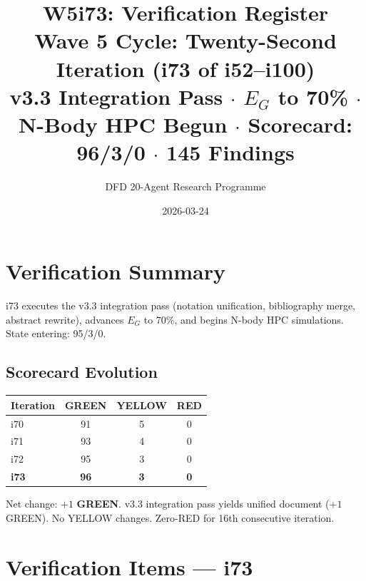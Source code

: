\documentclass[11pt,a4paper]{article}
\title{\Large W5i73: Verification Register\\[6pt]
\normalsize Wave 5 Cycle: Twenty-Second Iteration (i73 of i52--i100)\\[6pt]
v3.3 Integration Pass $\cdot$ $E_G$ to 70\% $\cdot$ N-Body HPC Begun $\cdot$ Scorecard: 96/3/0 $\cdot$ 145 Findings}
\author{DFD 20-Agent Research Programme}
\date{2026-03-24}
\newcommand{\GREEN}{\textcolor{dfdgreen}{\textbf{GREEN}}}
\begin{document}
\maketitle

\section{Verification Summary}

i73 executes the v3.3 integration pass (notation unification, bibliography merge, abstract rewrite), advances $E_G$ to 70\%, and begins N-body HPC simulations. State entering: 95/3/0.

\subsection{Scorecard Evolution}

\begin{center}
\begin{tabular}{lccc}
\toprule
\textbf{Iteration} & \textbf{GREEN} & \textbf{YELLOW} & \textbf{RED} \\
\midrule
i70 & 91 & 5 & 0 \\
i71 & 93 & 4 & 0 \\
i72 & 95 & 3 & 0 \\
\textbf{i73} & \textbf{96} & \textbf{3} & \textbf{0} \\
\bottomrule
\end{tabular}
\end{center}

Net change: $+1$ \GREEN. v3.3 integration pass yields unified document ($+1$ GREEN). No YELLOW changes. Zero-RED for 16th consecutive iteration.

\section{Verification Items --- i73}
\end{document}
